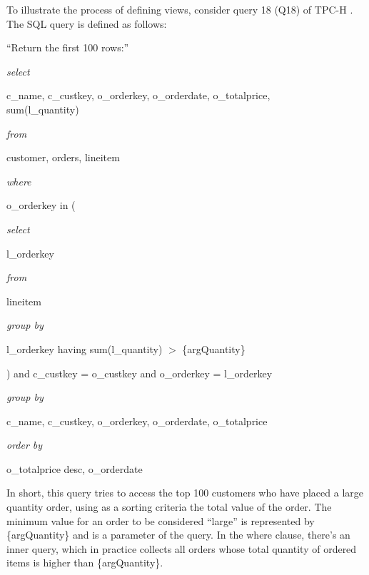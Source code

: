 \documentclass{vldb}
\begin{document}
To illustrate the process of defining views, consider query 18 (Q18) of TPC-H \cite{tpch}. The SQL query is defined as follows:

\vspace{1em}

``Return the first 100 rows:''

\emph{select}

	\hspace{1.5em} c\_name, c\_custkey, o\_orderkey, o\_orderdate, o\_totalprice, \\sum(l\_quantity)
	
\emph{from}

	\hspace{1.5em} customer, orders, lineitem

\emph{where}

	\hspace{1.5em} o\_orderkey in (
	
		\hspace{3em} \emph{select}
		
			\hspace{4.5em} l\_orderkey
			
		\hspace{3em} \emph{from}
		
			\hspace{4.5em} lineitem
			
		\hspace{3em} \emph{group by}
		
			\hspace{4.5em} l\_orderkey having sum(l\_quantity) $>$ \{argQuantity\}
			
		\hspace{1.5em}) and c\_custkey = o\_custkey and o\_orderkey = l\_orderkey
	
\emph{group by}

	\hspace{1.5em} c\_name, c\_custkey, o\_orderkey, o\_orderdate, o\_totalprice

\emph{order by}

	\hspace{1.5em} o\_totalprice desc, o\_orderdate
	
\vspace{1em}

In short, this query tries to access the top 100 customers who have placed a large quantity order, using as a sorting criteria the total value of the order.
The minimum value for an order to be considered ``large'' is represented by \{argQuantity\} and is a parameter of the query.
In the where clause, there's an inner query, which in practice collects all orders whose total quantity of ordered items is higher than \{argQuantity\}.
	
\end{document}
